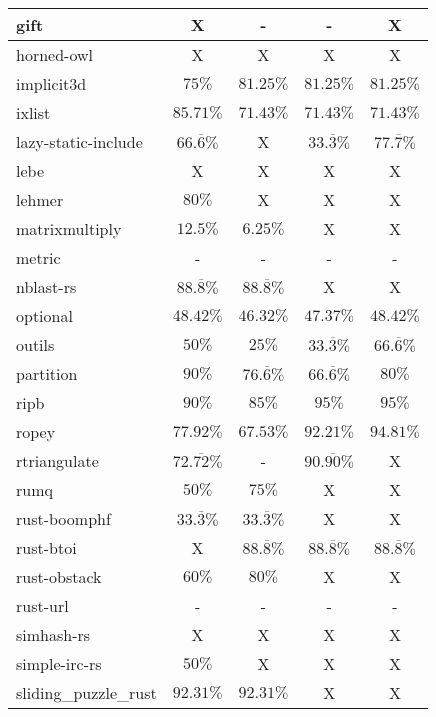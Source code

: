 \documentclass{article}
\begin{document}
\begin{longtable}[h!]{|l|c|c|c|c|}
     \hline
    gift & X & - & - & X \\ %
    \hline
    horned-owl & X & X & X & X \\ %
    \hline
    implicit3d & $75\%$ & $81.25\%$ & $81.25\%$ & $81.25\%$ \\ %
    \hline
    ixlist & $85.71\%$ & $71.43\%$ & $71.43\%$ & $71.43\%$ \\ %
    \hline
    lazy-static-include & $66.\overline{6}\%$ & X & $33.\overline{3}\%$ & $77.\overline{7}\%$ \\ %
    \hline
    lebe & X & X & X & X \\ %
     \hline
    lehmer & $80\%$ & X & X & X \\ %
    \hline
    matrixmultiply & $12.5\%$ & $6.25\%$ & X & X \\ %
    \hline
    metric & - & - & - & - \\ %
    \hline
    nblast-rs & $88.\overline{8}\%$ & $88.\overline{8}\%$ & X & X \\ %
    \hline
    optional & $48.42\%$ & $46.32\%$ & $47.37\%$ & $48.42\%$ \\ %
    \hline
    outils & $50\%$ & $25\%$ & $33.\overline{3}\%$ & $66.\overline{6}\%$ \\ %
     \hline
    partition & $90\%$ & $76.\overline{6}\%$ & $66.\overline{6}\%$ & $80\%$ \\ %
    \hline
    ripb & $90\%$ & $85\%$ & $95\%$ & $95\%$ \\ %
    \hline
    ropey & $77.92\%$ & $67.53\%$ & $92.21\%$ & $94.81\%$ \\ %
    \hline
    rtriangulate & $72.\overline{72}\%$ & - & $90.\overline{90}\%$ & X \\ %
    \hline
    rumq & $50\%$ & $75\%$ & X & X \\ %
    \hline
    rust-boomphf & $33.\overline{3}\%$ & $33.\overline{3}\%$ & X & X \\ %
     \hline
    rust-btoi & X & $88.\overline{8}\%$ & $88.\overline{8}\%$ & $88.\overline{8}\%$ \\ %
    \hline
    rust-obstack & $60\%$ & $80\%$ & X & X \\ %
    \hline
    rust-url & - & - & - & - \\ %
    \hline
    simhash-rs & X & X & X & X \\ %
    \hline
    simple-irc-rs & $50\%$ & X & X & X \\ %
    \hline
    sliding\_puzzle\_rust & $92.31\%$ & $92.31\%$ & X & X \\ %

\end{longtable}
\end{document}
